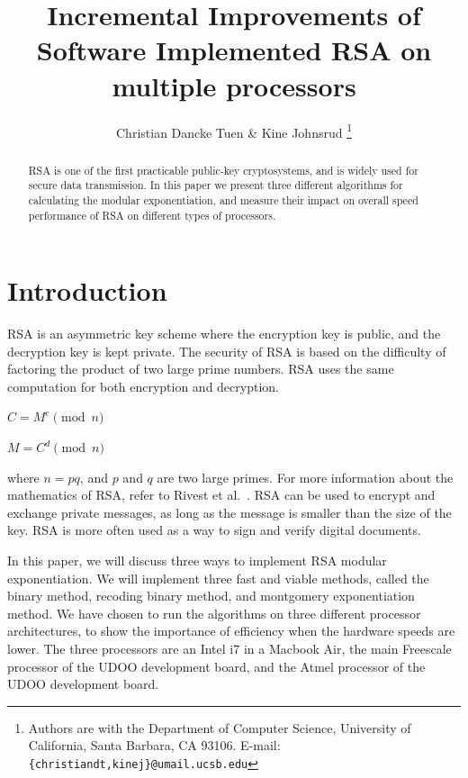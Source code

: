 \documentclass[twocolumn]{IEEEtran}
\begin{document}
\title{Incremental Improvements of Software Implemented RSA on multiple processors}


\author{Christian Dancke Tuen \& Kine Johnsrud
\thanks{Authors are with the
Department of Computer Science,
University of California, Santa Barbara, CA 93106.
E-mail: \texttt{\{christiandt,kinej\}@umail.ucsb.edu}}
}


\maketitle

\begin{abstract}
RSA is one of the first practicable public-key cryptosystems, and is widely used for secure data transmission. In this paper we present three different algorithms for calculating the modular exponentiation, and measure their impact on overall speed performance of RSA on different types of processors.
\end{abstract}

\section{Introduction}
RSA is an asymmetric key scheme where the encryption key is public, and the decryption key is kept private. The security of RSA is based on the difficulty of factoring the product of two large prime numbers. RSA uses the same computation for both encryption and decryption.

\bigskip

\centerline{$C = M^e \pmod{n}$}
\centerline{$M = C^d \pmod{n}$}

\bigskip

where $n = pq$, and $p$ and $q$ are two large primes. For more information about the mathematics of RSA, refer to Rivest et al.~\cite{rsa}. RSA can be used to encrypt and exchange private messages, as long as the message is smaller than the size of the key. RSA is more often used as a way to sign and verify digital documents. 

In this paper, we will discuss three ways to implement RSA modular exponentiation. We will implement three fast and viable methods, called the binary method, recoding binary method, and montgomery exponentiation method. We have chosen to run the algorithms on three different processor architectures, to show the importance of efficiency when the hardware speeds are lower. The three processors are an Intel i7 in a Macbook Air, the main Freescale processor of the UDOO development board, and the Atmel processor of the UDOO development board.
\end{document}
